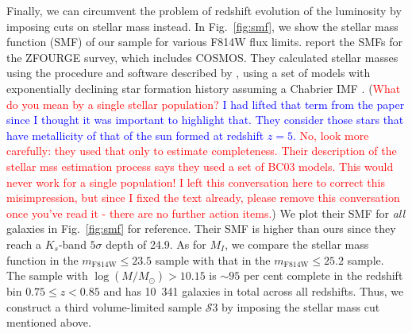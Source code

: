 \documentclass[twocolumn,useAMS,usenatbib]{mn2e}
\newcommand{\rachel}[1]{{\textcolor{red}{#1}}}
\newcommand{\arun}[1]{{\textcolor{blue}{#1}}}
\newcommand{\s}{\ensuremath{\mathcal{S}}}
\begin{document}


Finally, we can circumvent the problem of redshift evolution of the
luminosity by imposing cuts on stellar mass instead. In Fig.~\ref{fig:smf}, we show the stellar mass function (SMF) of our sample for various F814W flux limits.
\cite{Tomczak_SMF} report the SMFs for the ZFOURGE survey, which
includes COSMOS. They calculated stellar masses using the procedure
and software described by \cite{2009ApJ...700..221K}, using a set of models
with exponentially declining star formation history \citep{2003MNRAS.344.1000B} assuming a
Chabrier IMF \citep{ChabrierIMF}.  (\rachel{What do you mean by a single stellar population?} \arun{I had lifted that term from the paper since I thought it was important to highlight that. 
They consider those stars that have metallicity of that of the sun
formed at redshift $z=5$.} \rachel{No, look more carefully: they used
that only to estimate completeness.  Their description of the stellar
mss estimation process says they used a set of BC03
models.  This would never work for a single population!  I left this
conversation here to correct this misimpression, but since I
fixed the text already, please remove this conversation once you've
read it - there are no further action items.}) 
We plot their SMF for \emph{all} galaxies in Fig.~\ref{fig:smf} for
reference. Their SMF is higher than ours since they reach a $K_s$-band
$5\sigma$ depth of 24.9. 
As for $M_I$, we compare the stellar mass function in the $m_\text{F814W}\le23.5$ sample with that in the $m_\text{F814W}\le25.2$ sample. 
The sample with $\log(M/M_\odot) > 10.15$ is $\sim 95$ per cent
complete in the redshift bin $0.75 \le z< 0.85$ and has 10~341
galaxies in total across all redshifts.
Thus, we construct a third volume-limited sample \s$3$ by imposing the
stellar mass cut mentioned above. 
\end{document}
